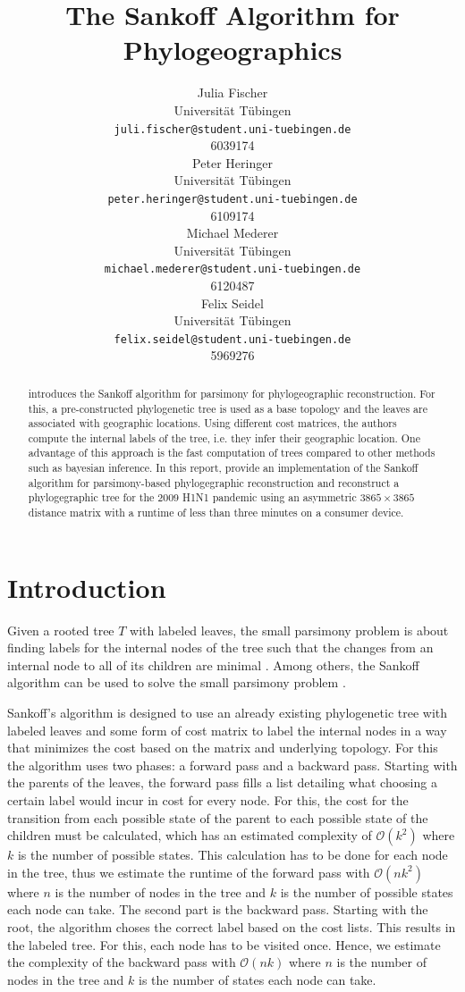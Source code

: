 \documentclass{article}
\title{The Sankoff Algorithm for Phylogeographics}
\author{
  Julia Fischer \\
  Universität Tübingen \\
  \texttt{juli.fischer@student.uni-tuebingen.de} \\
  6039174 \\
  \And
  Peter Heringer \\
  Universität Tübingen \\
  \texttt{peter.heringer@student.uni-tuebingen.de} \\
  6109174 \\
  \And 
  Michael Mederer \\
  Universität Tübingen \\
  \texttt{michael.mederer@student.uni-tuebingen.de} \\
  6120487 \\
  \And 
  Felix Seidel \\
  Universität Tübingen \\
  \texttt{felix.seidel@student.uni-tuebingen.de} \\
  5969276 \\
}
\begin{document}
\maketitle

\begin{abstract}
\cite{reimeringPhylogeographicReconstructionUsing2020} introduces the Sankoff
algorithm for parsimony for phylogeographic reconstruction. For this, a
pre-constructed phylogenetic tree is used as a base topology and the leaves are
associated with geographic locations. Using different cost matrices, the authors
compute the internal labels of the tree, i.e. they infer their geographic
location. One advantage of this approach is the fast computation of trees
compared to other methods such as bayesian inference. 
In this report, provide an implementation of the Sankoff algorithm for
parsimony-based phylogegraphic reconstruction and reconstruct a phylogegraphic
tree for the 2009 H1N1 pandemic using an asymmetric $3865 \times 3865$ distance
matrix with a runtime of less than three minutes on a consumer device. 
\end{abstract}


\section{Introduction}
Given a rooted tree $T$ with labeled leaves, the small parsimony problem is about
finding labels for the internal nodes of the tree such that the changes from an
internal node to all of its children are minimal
\cite{jonesIntroductionBioinformaticsAlgorithms2004}.
Among others, the Sankoff algorithm can be used to solve the small parsimony
problem \cite{sankoffMinimalMutationTrees1975}. 

Sankoff's algorithm is designed to use an already existing phylogenetic tree with labeled leaves and
some form of cost matrix to label the internal nodes in a way that minimizes the cost based on the
matrix and underlying topology. For this the algorithm uses two phases: a
forward pass and a backward pass.
Starting with the parents of the leaves, the forward pass fills a
list detailing what choosing a certain label would incur in
cost for every node. For this, the cost for the transition from each possible state of the
parent to each possible state of the children must be calculated, which has an
estimated complexity of $\mathcal{O}(k^2)$ where $k$ is the number of possible
states. This calculation has to be done for each node in the tree, thus we
estimate the runtime of the forward pass
with $\mathcal{O}(nk^2)$ where $n$ is the number of nodes in the tree and $k$ is
the number of possible states each node can take.
The second part is the backward pass. Starting with the root, the algorithm
choses the correct label based on the cost lists. This results in the labeled
tree. For this, each node has to be visited once. Hence, we estimate the
complexity of the backward pass with $\mathcal{O}(nk)$ where $n$ is the number of
nodes in the tree and $k$ is the number of states each node can take.
\end{document}
